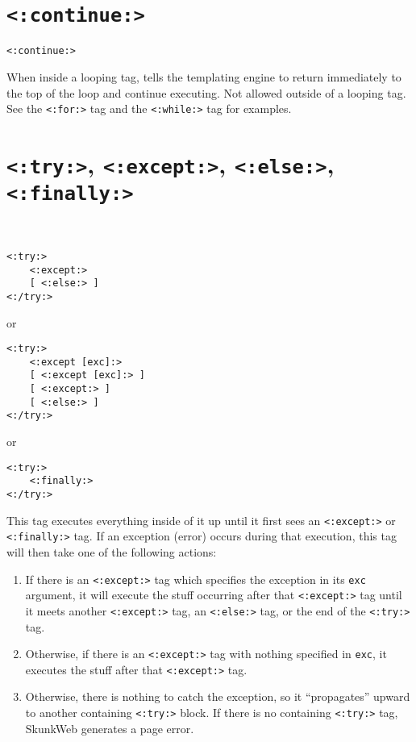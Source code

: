 \documentclass{manual}
\begin{document}
\section{\texttt{<:continue:>}}
\label{tagcontinue}

\begin{verbatim}<:continue:>\end{verbatim}

When inside a looping tag, tells the templating engine to return
immediately to the top of the loop and continue executing.
Not allowed outside of a looping tag.
See the \texttt{<:for:>}  tag
and the \texttt{<:while:>}  tag
for examples.


\section{\texttt{<:try:>}, \texttt{<:except:>}, \texttt{<:else:>}, \texttt{<:finally:>}}
\label{tagtry}

\ 

\begin{verbatim}
<:try:>
    <:except:>
    [ <:else:> ]
<:/try:>
\end{verbatim}

or 

\begin{verbatim}
<:try:>
    <:except [exc]:>
    [ <:except [exc]:> ]
    [ <:except:> ]
    [ <:else:> ]
<:/try:>
\end{verbatim}

or 

\begin{verbatim}
<:try:>
    <:finally:>
<:/try:>
\end{verbatim}


This tag executes everything inside of it up until it first sees an
\texttt{<:except:>} or \texttt{<:finally:>} tag. If an exception
(error) occurs during that execution, this tag will then take one of the following
actions:

\begin{enumerate}
\item If there is an \texttt{<:except:>} tag which specifies the
exception in its \texttt{exc} argument, it will execute the stuff occurring
after that \texttt{<:except:>} tag until it meets another 
\texttt{<:except:>} tag, an \texttt{<:else:>} tag, or
the end of the \texttt{<:try:>} tag.

\item Otherwise, if there is an \texttt{<:except:>} tag with
nothing specified in \texttt{exc}, it executes the stuff after that
\texttt{<:except:>} tag.

\item Otherwise, there is nothing to catch the exception, so it ``propagates''
upward to another containing \texttt{<:try:>} block. If there
is no containing \texttt{<:try:>} tag, SkunkWeb generates
a page error.

\end{enumerate}
\end{document}
